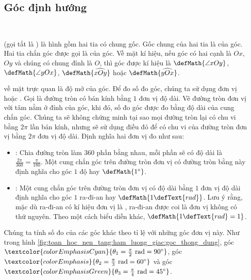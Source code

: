 \subsection{Góc định hướng}

\ %

 (gọi tắt là ) là hình gồm hai tia có chung gốc. Gốc chung của hai tia là  của góc. Hai tia chắn góc được gọi là  của góc. Về mặt kí hiệu, nếu góc có hai cạnh là $Ox$, $Oy$ và chúng có chung đỉnh là $O$, thì góc được kí hiệu là $\defMath{\angle xOy}$,  $\defMath{\angle yOx}$, $\defMath{\widehat{xOy}}$ hoặc $\defMath{\widehat{yOx}}$.

 về mặt trực quan là độ mở của góc. Để đo số đo góc, chúng ta sử dụng đơn vị  hoặc . Gọi  là đường tròn có bán kính bằng $1$ đơn vị độ dài. Vẽ đường tròn đơn vị với tâm nằm ở đỉnh của góc, khi đó, số đo góc được đo bằng độ dài của cung chắn góc. Chúng ta sẽ không chứng minh tại sao mọi đường tròn lại có chu vi bằng $2\pi$ lần bán kính, nhưng sẽ sử dụng điều đó để có chu vi của đường tròn đơn vị bằng $2\pi$ đơn vị độ dài. Định nghĩa hai đơn vị đo như sau:
\begin{itemize}
   \item {}: Chia đường tròn làm $360$ phần bằng nhau, mỗi phần sẽ có độ dài là $\frac{2\pi}{360} = \frac{\pi}{180}$. Một cung chắn góc trên đường tròn đơn vị có đường tròn bằng này định nghĩa cho góc $1$ độ hay $\defMath{1^\circ}$.
   \item {}: Một cung chắn góc trên đường tròn đơn vị có độ dài bằng $1$ đơn vị độ dài định nghĩa cho góc $1$ ra-đi-an hay $\defMath{1\defText{ rad}}$. Lưu ý rằng, mặc dù ra-đi-an có kí hiệu đơn vị là , ra-đi-an được coi là đơn vị không có thứ nguyên. Theo một cách biểu diễn khác, $\defMath{1\defText{ rad} = 1}$.
\end{itemize}

Chúng ta tính số đo của các góc khác theo tỉ lệ với những góc đơn vị này. Như trong hình \ref{fig:toan_hoc_nen_tang:ham_luong_giac:goc_thong_dung}, góc $\textcolor{colorEmphasisCyan}{\theta_1 = \frac{\pi}{2} \text{ rad} = 90^\circ}$, góc $\textcolor{colorEmphasis}{\theta_2 = \frac{\pi}{3} \text{ rad} = 60^\circ}$ và góc $\textcolor{colorEmphasisGreen}{\theta_3 = \frac{\pi}{4} \text{ rad} = 45^\circ}$.

